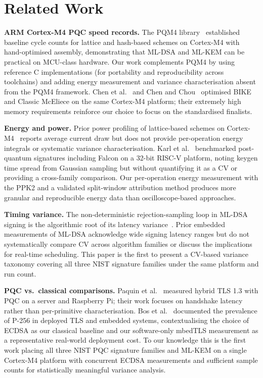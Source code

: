 \documentclass[iicol]{sn-jnl}
\begin{document}
\section{Related Work}
\label{sec:related}

\textbf{ARM Cortex-M4 PQC speed records.}
The PQM4 library~\cite{pqm4} established baseline cycle counts for
lattice and hash-based schemes on Cortex-M4 with hand-optimised assembly,
demonstrating that ML-DSA and ML-KEM can be practical on MCU-class hardware.
Our work complements PQM4 by using reference C implementations (for
portability and reproducibility across toolchains) and adding energy
measurement and variance characterisation absent from the PQM4 framework.
Chen et al.~\cite{chen2021bike} and Chen and Chou~\cite{chen2021mceliece}
optimised BIKE and Classic McEliece on the same Cortex-M4 platform;
their extremely high memory requirements reinforce our choice to focus
on the standardised finalists.

\textbf{Energy and power.}
Prior power profiling of lattice-based schemes on Cortex-M4~\cite{pqm4}
reports average current draw but does not provide per-operation energy
integrals or systematic variance characterisation.
Karl et al.~\cite{karl2024} benchmarked post-quantum signatures including
Falcon on a 32-bit RISC-V platform, noting keygen time spread from
Gaussian sampling but without quantifying it as a CV or providing a
cross-family comparison.
Our per-operation energy measurement with the PPK2 and a validated
split-window attribution method produces more granular and reproducible
energy data than oscilloscope-based approaches.

\textbf{Timing variance.}
The non-deterministic rejection-sampling loop in ML-DSA signing is the
algorithmic root of its latency variance~\cite{nist-fips204,dilithium-spec}.
Prior embedded measurements of ML-DSA acknowledge wide signing latency
ranges but do not systematically compare CV across algorithm families or
discuss the implications for real-time scheduling.
This paper is the first to present a CV-based variance taxonomy covering
all three NIST signature families under the same platform and run count.

\textbf{PQC vs.\ classical comparisons.}
Paquin et al.~\cite{paquin2020} measured hybrid TLS 1.3 with PQC on
a server and Raspberry Pi; their work focuses on handshake latency rather
than per-primitive characterisation.
Bos et al.~\cite{bos2014} documented the prevalence of P-256 in deployed
TLS and embedded systems, contextualising the choice of ECDSA as our
classical baseline and our software-only mbedTLS measurement as a
representative real-world deployment cost.
To our knowledge this is the first work placing all three NIST PQC signature
families and ML-KEM on a single Cortex-M4 platform with concurrent ECDSA
measurements and sufficient sample counts for statistically meaningful
variance analysis.
\end{document}
